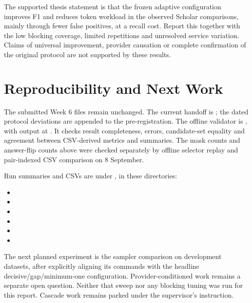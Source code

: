 \documentclass[11pt]{article}
\begin{document}
The supported thesis statement is that the frozen adaptive configuration improves
F1 and reduces token workload in the observed Scholar comparisons, mainly through
fewer false positives, at a recall cost. Report this together with the low blocking
coverage, limited repetitions and unresolved service variation. Claims of universal
improvement, provider causation or complete confirmation of the original protocol
are not supported by these results.

\section{Reproducibility and Next Work}
The submitted Week 6 files remain unchanged. The current handoff is
; the dated protocol deviations are appended to the
pre-registration. The offline validator is
, with output at
. It checks result completeness, errors,
candidate-set equality and agreement between CSV-derived metrics and summaries.
The mask counts and answer-flip counts above were checked separately by offline
selector replay and pair-indexed CSV comparison on 8 September.

Run summaries and CSVs are under , in these directories:
\begin{itemize}\small
\item {}
\item {}
\item {}
\item {}
\item {}
\item {}
\end{itemize}

The next planned experiment is the sampler comparison on development datasets,
after explicitly aligning its commands with the headline decisive/gap/minimum-one
configuration. Provider-conditioned work remains a separate open question.
Neither that sweep nor any blocking tuning was run for this report. Cascade work
remains parked under the supervisor's instruction.
\end{document}
